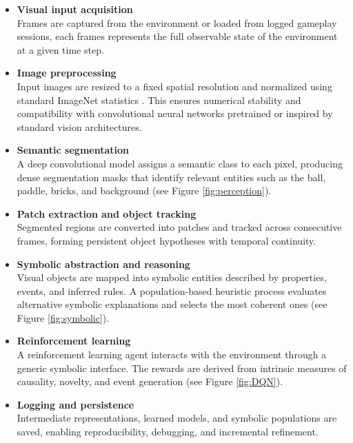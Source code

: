 \documentclass[12pt,a4paper]{report}
\begin{document}
\begin{itemize}

    \item \textbf{Visual input acquisition} \\
    Frames are captured from the environment or loaded from logged gameplay sessions, each frames represents the full observable state of the environment at a given time step.

    \item \textbf{Image preprocessing} \\
    Input images are resized to a fixed spatial resolution and normalized using standard ImageNet statistics \cite{chiave56}. 
    This ensures numerical stability and compatibility with convolutional neural networks pretrained or inspired by standard vision architectures.

    \item \textbf{Semantic segmentation} \\
    A deep convolutional model assigns a semantic class to each pixel, producing dense segmentation masks that identify relevant entities such as the ball, paddle, bricks, and background (see Figure \ref{fig:perception}).

    \item \textbf{Patch extraction and object tracking} \\
    Segmented regions are converted into patches and tracked across consecutive frames, forming persistent object hypotheses with temporal continuity.

    \item \textbf{Symbolic abstraction and reasoning} \\
    Visual objects are mapped into symbolic entities described by properties, events, and inferred rules. 
    A population-based heuristic process evaluates alternative symbolic explanations and selects the most coherent ones (see Figure \ref{fig:symbolic}).

    \item \textbf{Reinforcement learning} \\
    A reinforcement learning agent interacts with the environment through a generic symbolic interface. 
    The rewards are derived from intrinsic measures of causality, novelty, and event generation (see Figure \ref{fig:DQN}).

    \item \textbf{Logging and persistence} \\
    Intermediate representations, learned models, and symbolic populations are saved, enabling reproducibility, debugging, and incremental refinement.

\end{itemize}
\end{document}
